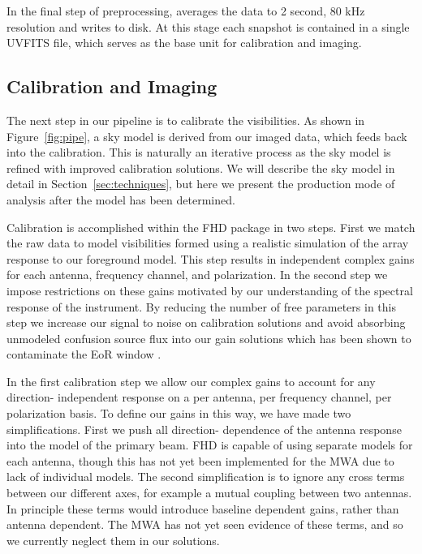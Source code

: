 \documentclass[iop]{emulateapj}
\begin{document}
In the final step of preprocessing, \cotter averages the data to 2 second, 80 kHz resolution 
and writes to disk. At this stage each snapshot is contained in a single UVFITS file, which 
serves as the base unit for calibration and imaging.


\subsection{Calibration and Imaging}\label{subsec:cal_imaging}
The next step in our pipeline is to calibrate the visibilities. As shown in Figure~\ref{fig:pipe}, 
a sky model is derived from our imaged data, which feeds back into the calibration. This is 
naturally an iterative process as the sky model is refined with improved calibration 
solutions. We will describe the sky model in detail in Section~\ref{sec:techniques}, but here 
we present the production mode of analysis after the model has been determined.

Calibration is accomplished within the FHD package in two steps. First we match the raw 
data to model visibilities formed using a realistic simulation of the array response to our 
foreground model. This step results in independent complex gains for each antenna, 
frequency channel, and polarization. In the second step we impose restrictions on these 
gains motivated by our understanding of the spectral response of the instrument. By 
reducing the number of free parameters in this step we increase our signal to noise on 
calibration solutions and avoid absorbing unmodeled confusion source flux into our gain 
solutions which has been shown to contaminate the EoR window \citep{Barry:2016}. 

In the first calibration step we allow our complex gains to account for any direction-
independent response on a per antenna, per frequency channel, per polarization basis. To 
define our gains in this way, we have made two simplifications. First we push all direction-
dependence of the antenna response into the model of the primary beam. FHD is capable 
of using separate models for each antenna, though this has not yet been implemented for 
the MWA due to lack of individual models. The second simplification is to ignore any cross 
terms between our different axes, for example a mutual coupling between two antennas. In 
principle these terms would introduce baseline dependent gains, rather than antenna 
dependent. The MWA has not yet seen evidence of these terms, and so we currently 
neglect them in our solutions.
\end{document}

